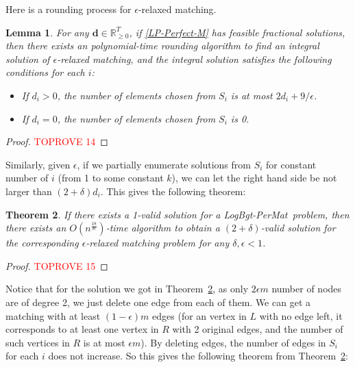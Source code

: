 \documentclass[11pt,a4paper]{article} \usepackage{enumitem}
\newcommand{\boldd}{\boldsymbol{d}}
\newcommand{\LBOmatch}{\textsf{LogBgt-PerMat}}
\newtheorem{theorem}{Theorem}[section]
\newtheorem{lemma}[theorem]{Lemma}
\theoremstyle{definition}
\begin{document}
Here is a rounding process for $\epsilon$-relaxed matching.

\begin{lemma} \label{lem:matching-2}
For any $\boldd\in \mathbb{R}^{T}_{\ge 0}$, if \ref{LP-Perfect-M} has feasible fractional solutions, then there exists an polynomial-time rounding algorithm to find an integral solution of $\epsilon$-relaxed matching, and the integral solution satisfies the following conditions for each $i$:

\begin{itemize}

\item If $d_i>0$, the number of elements chosen from $S_i$ is at most $2d_i+9/\epsilon$. 

\item If $d_i=0$, the number of elements chosen from $S_i$ is 0.
\end{itemize}
\end{lemma}
\begin{proof}\textcolor{red}{TOPROVE 14}\end{proof}

Similarly, given $\epsilon$, if we partially enumerate solutions from $S_i$ for constant number of $i$ (from 1 to some constant $k$), we can let the right hand side be not larger than $(2+\delta)d_i$. This gives the following theorem:

\begin{theorem}
\label{thm:relaxed}
If there exists a 1-valid solution for a \LBOmatch\ problem, then there exists an $O(n^{\frac{18}{\delta\epsilon}})$-time algorithm to obtain a $(2+\delta)$-valid solution for the corresponding $\epsilon$-relaxed matching problem for any $\delta,\epsilon<1$.
\end{theorem}

\begin{proof}\textcolor{red}{TOPROVE 15}\end{proof}

Notice that for the solution we got in Theorem~\ref{thm:relaxed}, as only $2\epsilon m$ number of nodes are of degree 2, we just delete one edge from each of them. 
We can get a matching with at least $(1-\epsilon)m$ edges (for an vertex in $L$ with no edge left, it corresponds to at least one vertex in $R$ with 2 original edges, and the number of such vertices in $R$ is at most $\epsilon m$). 
By deleting edges, the number of edges in $S_i$ for each $i$ does not increase. So this gives the following theorem from Theorem~\ref{thm:relaxed}:
\end{document}
